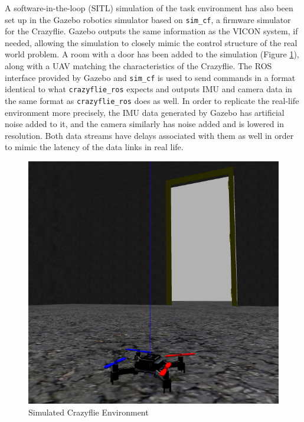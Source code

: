 \documentclass[12pt]{article}
\begin{document}
A software-in-the-loop (SITL) simulation of the task environment has also been set up in the Gazebo robotics simulator based on \verb|sim_cf|\cite{sim_cf}, a firmware simulator for the Crazyflie. Gazebo outputs the same information as the VICON system, if needed, allowing the simulation to closely mimic the control structure of the real world problem. A room with a door has been added to the simulation (Figure \ref{gazebo}), along with a UAV matching the characteristics of the Crazyflie. The ROS interface provided by Gazebo and \verb|sim_cf| is used to send commands in a format identical to what \verb|crazyflie_ros| expects and outputs IMU and camera data in the same format as \verb|crazyflie_ros| does as well. In order to replicate the real-life environment more precisely, the IMU data generated by Gazebo has artificial noise added to it, and the camera similarly has noise added and is lowered in resolution. Both data streams have delays associated with them as well in order to mimic the latency of the data links in real life. 
\begin{figure}
	\centering
	\includegraphics[scale=0.5]{gazebo}
	\vspace{20pt}
	\caption[Simulated Crazyflie Environment]{Simulated Crazyflie Environment}
	\label{gazebo}
\end{figure}
\end{document}
